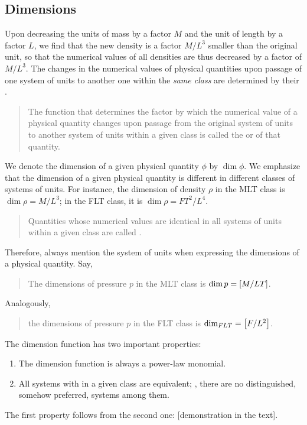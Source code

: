 \subsection{Dimensions}
Upon decreasing the units of mass by a factor $M$ and the unit of length by a factor $L$, we find that the new density is a factor $M/L^3$ smaller than the original unit, so that the numerical values of all densities are thus decreased by a factor of $M/L^3$. The changes in the numerical values of physical quantities upon passage of one system of units to another one within the \emph{same class} are determined by their .
\begin{quote}
The function that determines the factor by which the numerical value of a physical quantity changes upon passage from the original system of units to another system of units within a given class is called the  or  of that quantity.
\end{quote}
We denote the dimension of a given physical quantity $\phi$ by $\dim\phi$. We emphasize that the dimension of a given physical quantity is different in different classes of systems of units. For instance, the dimension of density $\rho$ in the MLT class is $\dim\rho = M/L^3$; in the FLT class, it is $\dim\rho = FT^2/L^4$.
\begin{quote}
Quantities whose numerical values are identical in all systems of units within a given class are called .
\end{quote}
Therefore, always mention the system of units when expressing the dimensions of a physical quantity. Say,
\begin{quote}
The dimensions of pressure $p$ in the MLT class is $\dim p = \left[{M/LT}\right]$.
\end{quote}
Analogously,
\begin{quote}
the dimensions of pressure $p$ in the FLT class is $\operatorname*{dim}_{FLT} = \left[{F/L^2}\right]$.
\end{quote}

The dimension function has two important properties:
\begin{enumerate}
\item The dimension function is always a power-law monomial.
\item All systems with in a given class are equivalent; \ie, there are no distinguished, somehow preferred, systems among them.
\end{enumerate}
The first property follows from the second one: [demonstration in the text].

